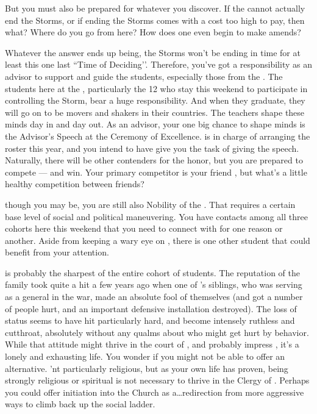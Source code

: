 \documentclass[char]{GL2020}
\begin{document}
 But you must also be prepared for whatever you discover. If the \pTech{} cannot actually end the Storms, or if ending the Storms comes with a cost too high to pay, then what? Where do you go from here? How does one even begin to make amends?

Whatever the answer ends up being, the Storms won't be ending in time for at least this one last ``Time of Deciding’’. Therefore, you've got a responsibility as an advisor to support and guide the students, especially those from the \pFarm{}. The students here at the \pSc{}, particularly the 12 who stay this weekend to participate in controlling the Storm, bear a huge responsibility. And when they graduate, they will go on to be movers and shakers in their countries. The teachers shape these minds day in and day out. As an advisor, your one big chance to shape minds is the Advisor's Speech at the Ceremony of Excellence. \cMusic{} is in charge of arranging the roster this year, and you intend to have \cMusic{\them} give you the task of giving the speech. Naturally, there will be other contenders for the honor, but you are prepared to compete — and win. Your primary competitor is your friend \cCurse{}, but what's a little healthy competition between friends?

\cHedonist{\Cleric} though you may be, you are still also Nobility of the \pFarm{}. That requires a certain base level of social and political maneuvering. You have contacts among all three cohorts here this weekend that you need to connect with for one reason or another. Aside from keeping a wary eye on \cDisney{}, there is one other student that could benefit from your attention.

\cLibAssist{\intro} is probably the sharpest of the entire cohort of students. The reputation of the \cLibAssist{\formal} family took quite a hit a few years ago when one of \cLibAssist{}’s siblings, who was serving as a general in the war, made an absolute fool of themselves (and got a number of people hurt, and an important defensive installation destroyed). The loss of status seems to have hit \cLibAssist{} particularly hard, and \cLibAssist{\theyhave} become intensely ruthless and cutthroat, absolutely without any qualms about who might get hurt by \cLibAssist{\their} behavior. While that attitude might thrive in the court of \cQueen{\full}, and probably impress \cPrince{\intro}, it’s a lonely and exhausting life. You wonder if you might not be able to offer \cLibAssist{} an alternative. \cLibAssist{\Theyare}’nt particularly religious, but as your own life has proven, being strongly religious or spiritual is not necessary to thrive in the Clergy of \cFarmGod{}. Perhaps you could offer initiation into the Church as a\ldots redirection from more aggressive ways to climb back up the social ladder.
\end{document}
